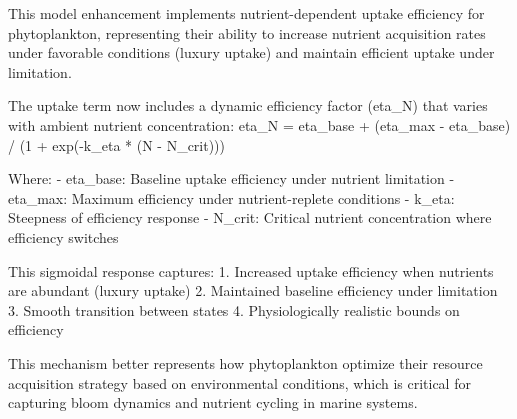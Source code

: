 This model enhancement implements nutrient-dependent uptake efficiency for phytoplankton, representing their ability to increase nutrient acquisition rates under favorable conditions (luxury uptake) and maintain efficient uptake under limitation.

The uptake term now includes a dynamic efficiency factor (eta_N) that varies with ambient nutrient concentration:
eta_N = eta_base + (eta_max - eta_base) / (1 + exp(-k_eta * (N - N_crit)))

Where:
- eta_base: Baseline uptake efficiency under nutrient limitation
- eta_max: Maximum efficiency under nutrient-replete conditions  
- k_eta: Steepness of efficiency response
- N_crit: Critical nutrient concentration where efficiency switches

This sigmoidal response captures:
1. Increased uptake efficiency when nutrients are abundant (luxury uptake)
2. Maintained baseline efficiency under limitation
3. Smooth transition between states
4. Physiologically realistic bounds on efficiency

This mechanism better represents how phytoplankton optimize their resource acquisition strategy based on environmental conditions, which is critical for capturing bloom dynamics and nutrient cycling in marine systems.
